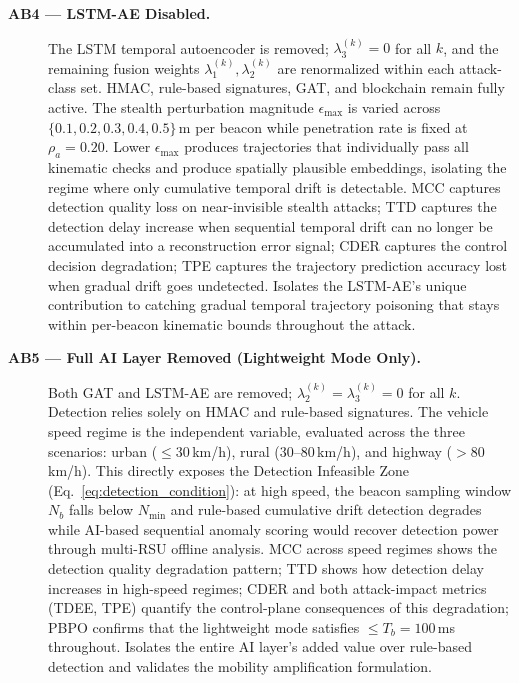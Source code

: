 \documentclass[12pt, a4paper]{report}
\begin{document}
\begin{description}
\item[\textbf{AB4 --- LSTM-AE Disabled.}]
The LSTM temporal autoencoder is removed; $\lambda_3^{(k)} = 0$ for
all $k$, and the remaining fusion weights $\lambda_1^{(k)}, \lambda_2^{(k)}$
are renormalized within each attack-class set.
HMAC, rule-based signatures, GAT, and blockchain remain fully active.
The stealth perturbation magnitude $\epsilon_{\max}$ is varied across
$\{0.1, 0.2, 0.3, 0.4, 0.5\}$\,m per beacon while penetration rate
is fixed at $\rho_a = 0.20$. Lower $\epsilon_{\max}$ produces
trajectories that individually pass all kinematic checks and produce
spatially plausible embeddings, isolating the regime where only
cumulative temporal drift is detectable. MCC captures detection
quality loss on near-invisible stealth attacks; TTD captures the
detection delay increase when sequential temporal drift can no longer
be accumulated into a reconstruction error signal; CDER captures
the control decision degradation; TPE captures the trajectory
prediction accuracy lost when gradual drift goes undetected.
Isolates the LSTM-AE's unique contribution to catching gradual
temporal trajectory poisoning that stays within per-beacon kinematic
bounds throughout the attack.

\item[\textbf{AB5 --- Full AI Layer Removed (Lightweight Mode Only).}]
Both GAT and LSTM-AE are removed; $\lambda_2^{(k)} = \lambda_3^{(k)} = 0$
for all $k$.
Detection relies solely on HMAC and rule-based signatures. The
vehicle speed regime is the independent variable, evaluated across
the three scenarios: urban ($\leq 30$\,km/h), rural
($30$--$80$\,km/h), and highway ($> 80$\,km/h). This directly
exposes the Detection Infeasible Zone (Eq.~\ref{eq:detection_condition}):
at high speed, the beacon sampling window $N_b$ falls below
$N_{\min}$ and rule-based cumulative drift detection degrades
while AI-based sequential anomaly scoring would recover detection
power through multi-RSU offline analysis. MCC across speed regimes
shows the detection quality degradation pattern; TTD shows how
detection delay increases in high-speed regimes; CDER and both
attack-impact metrics (TDEE, TPE) quantify the control-plane
consequences of this degradation; PBPO confirms that the
lightweight mode satisfies $\leq T_b = 100$\,ms throughout.
Isolates the entire AI layer's added value over rule-based
detection and validates the mobility amplification formulation.


\end{description}
\end{document}

